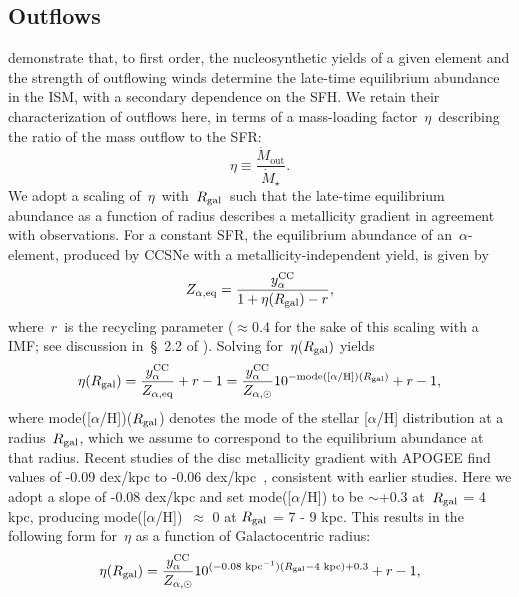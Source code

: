 \documentclass[draft2.tex]{subfiles}
\begin{document}
\subsection{Outflows} 
\label{sec:methods:outflows} 
\citet{Weinberg2017} demonstrate that, to first order, the nucleosynthetic 
yields of a given element and the strength of outflowing winds determine the 
late-time equilibrium abundance in the ISM, with a secondary dependence on the 
SFH. 
We retain their characterization of outflows here, in terms of a mass-loading 
factor~$\eta$~describing the ratio of the mass outflow to the SFR: 
\begin{equation} 
\eta \equiv \frac{\dot{M}_\text{out}}{\dot{M}_\star}. 
\end{equation} 
We adopt a scaling of~$\eta$~with~$R_\text{gal}$~such that the late-time 
equilibrium abundance as a function of radius describes a metallicity 
gradient in agreement with observations. 
For a constant SFR, the equilibrium abundance of an~$\alpha$-element, produced 
by CCSNe with a metallicity-independent yield, is given by 
\begin{equation} 
Z_{\alpha,\text{eq}} = \frac{y_\alpha^\text{CC}}{1 + \eta(R_\text{gal}) - r}, 
\end{equation} 
where~$r$~is the recycling parameter ($\approx$0.4 for the sake of this scaling 
with a~\citealp{Kroupa2001} IMF; see discussion in~\S~2.2 
of \citealp{Weinberg2017}). Solving for~$\eta(R_\text{gal})$ yields 
\begin{equation} 
\eta(R_\text{gal}) = \frac{y_\alpha^\text{CC}}{Z_{\alpha,\text{eq}}} + r - 1 = 
\frac{y_\alpha^\text{CC}}{Z_{\alpha,\odot}}10^{-\text{mode([$\alpha$/H])}
(R_\text{gal})} + r - 1, 
\end{equation} 
where mode([$\alpha$/H])($R_\text{gal}$) denotes the mode of the stellar 
[$\alpha$/H] distribution at a radius~$R_\text{gal}$, which we assume to correspond 
to the equilibrium abundance at that radius. 
Recent studies of the disc metallicity gradient with APOGEE find values of 
-0.09 dex/kpc to -0.06 dex/kpc~\citep[e.g.][]{Frinchaboy2013, Hayden2014, 
Weinberg2019}, consistent with earlier studies. 
Here we adopt a slope of -0.08 dex/kpc and set mode([$\alpha$/H]) to be 
$\sim$+0.3 at~$R_\text{gal}$ = 4 kpc, producing mode([$\alpha$/H])~$\approx$ 0 at 
$R_\text{gal}$ = 7 - 9 kpc. This results in the following form for~$\eta$ as a 
function of Galactocentric radius: 
\begin{equation} 
\eta(R_\text{gal}) = \frac{y_\alpha^\text{CC}}{Z_{\alpha,\odot}} 
10^{(-0.08\text{ kpc}^{-1})(R_\text{gal} - 4\text{ kpc}) + 0.3} + r - 1, 
\label{eq:eta_rgal} 
\end{equation} 
\end{document}
